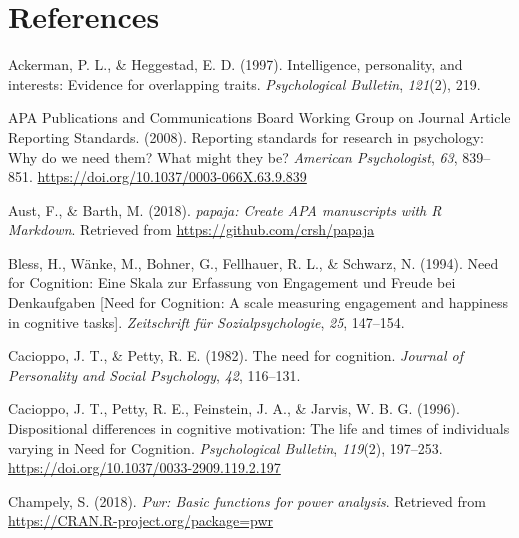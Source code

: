 \documentclass[
  man]{apa6}
\newlength{\cslhangindent}
\newlength{\cslentryspacingunit} %
\newenvironment{CSLReferences}[2] %
 {%
  \setlength{\parindent}{0pt}
  \ifodd #1
  \let\oldpar\par
  \def\par{\hangindent=\cslhangindent\oldpar}
  \fi
  \setlength{\parskip}{#2\cslentryspacingunit}
 }%
 {}
\begin{document}
\newpage

\hypertarget{references}{%
\section{References}\label{references}}

\begingroup
\setlength{\parindent}{-0.5in}
\setlength{\leftskip}{0.5in}

\hypertarget{refs}{}
\begin{CSLReferences}{1}{0}
\leavevmode{}%
Ackerman, P. L., \& Heggestad, E. D. (1997). Intelligence, personality, and interests: Evidence for overlapping traits. \emph{Psychological Bulletin}, \emph{121}(2), 219.

\leavevmode{}%
APA Publications and Communications Board Working Group on Journal Article Reporting Standards. (2008). Reporting standards for research in psychology: Why do we need them? What might they be? \emph{American Psychologist}, \emph{63}, 839--851. \url{https://doi.org/10.1037/0003-066X.63.9.839}

\leavevmode{}%
Aust, F., \& Barth, M. (2018). \emph{{papaja}: {Create} {APA} manuscripts with {R Markdown}}. Retrieved from \url{https://github.com/crsh/papaja}

\leavevmode{}%
Bless, H., Wänke, M., Bohner, G., Fellhauer, R. L., \& Schwarz, N. (1994). Need for {C}ognition: {E}ine {S}kala zur {E}rfassung von {E}ngagement und {F}reude bei {D}enkaufgaben {[}{N}eed for {C}ognition: A scale measuring engagement and happiness in cognitive tasks{]}. \emph{Zeitschrift {f}{ü}r Sozialpsychologie}, \emph{25}, 147--154.

\leavevmode{}%
Cacioppo, J. T., \& Petty, R. E. (1982). The need for cognition. \emph{Journal of Personality and Social Psychology}, \emph{42}, 116--131.

\leavevmode{}%
Cacioppo, J. T., Petty, R. E., Feinstein, J. A., \& Jarvis, W. B. G. (1996). Dispositional differences in cognitive motivation: The life and times of individuals varying in {N}eed for {C}ognition. \emph{Psychological Bulletin}, \emph{119}(2), 197--253. \url{https://doi.org/10.1037/0033-2909.119.2.197}

\leavevmode{}%
Champely, S. (2018). \emph{Pwr: Basic functions for power analysis}. Retrieved from \url{https://CRAN.R-project.org/package=pwr}


\end{CSLReferences}
\end{document}
